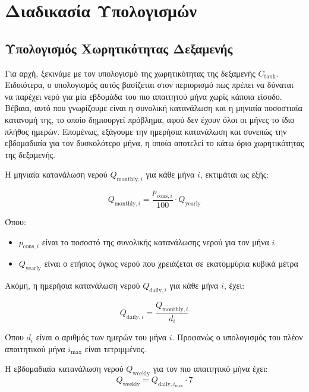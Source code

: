 \section{Διαδικασία Υπολογισμών}

\subsection{Υπολογισμός Χωρητικότητας Δεξαμενής}
Για αρχή, ξεκινάμε με τον υπολογισμό της χωρητικότητας της δεξαμενής \(C_{\text{tank}}\).
Ειδικότερα, ο υπολογισμός αυτός βασίζεται στον περιορισμό πως πρέπει να δύναται
να παρέχει νερό για μία εβδομάδα του πιο απαιτητού μήνα χωρίς κάποια είσοδο.
Βέβαια, αυτό που γνωρίζουμε είναι η συνολική κατανάλωση και η μηνιαία
ποσοστιαία κατανομή της, το οποίο δημιουργεί πρόβλημα, αφού δεν έχουν όλοι οι
μήνες το ίδιο πλήθος ημερών. Επομένως, εξάγουμε την ημερήσια κατανάλωση και
συνεπώς την εβδομαδιαία για τον δυσκολότερο μήνα, η οποία αποτελεί το κάτω όριο
χωρητικότητας της δεξαμενής.

Η μηνιαία κατανάλωση νερού \(Q_{\text{monthly}, i}\) για κάθε μήνα \(i\), εκτιμάται ως εξής:

\begin{equation}\label{eq:monthly_water_consumption}
	Q_{\text{monthly}, i} = \frac{p_{\text{cons}, i}}{100} \cdot Q_{\text{yearly}}
\end{equation}

Όπου:
\begin{itemize}
	\item \(p_{\text{cons}, i}\) είναι το ποσοστό της συνολικής κατανάλωσης νερού για τον μήνα \(i\)
	\item \(Q_{\text{yearly}}\) είναι ο ετήσιος όγκος νερού που χρειάζεται σε εκατομμύρια κυβικά μέτρα
\end{itemize}

Ακόμη, η ημερήσια κατανάλωση νερού \(Q_{\text{daily}, i}\) για κάθε μήνα \(i\), έχει:

\begin{equation}\label{eq:daily_water_consumption}
	Q_{\text{daily}, i} = \frac{Q_{\text{monthly}, i}}{d_i}
\end{equation}

Όπου \(d_i\) είναι ο αριθμός των ημερών του μήνα \(i\). Προφανώς ο υπολογισμός
του πλέον απαιτητικού μήνα \(i_{\text{max}}\) είναι τετριμμένος.

Η εβδομαδιαία κατανάλωση νερού \(Q_{\text{weekly}}\) για τον πιο απαιτητικό μήνα έχει:
\begin{equation}\label{eq:weekly_water_consumption}
	Q_{\text{weekly}} = Q_{\text{daily}, i_{\text{max}}} \cdot 7
\end{equation}

